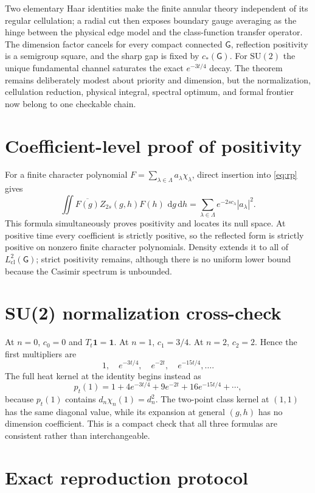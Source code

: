\documentclass[11pt]{article}
\theoremstyle{remark}
\newcommand{\SU}{\mathrm{SU}(2)}
\newcommand{\G}{\mathsf G}
\newcommand{\dd}{\,\mathrm d}
\newcommand{\HclG}{L^2_{\mathrm{cl}}(\G)}
\begin{document}
Two elementary Haar identities make the finite annular theory independent of
its regular cellulation; a radial cut then exposes boundary gauge averaging as
the hinge between the physical edge model and the class-function transfer
operator.  The dimension factor cancels for every compact connected $\G$,
reflection positivity is a semigroup square, and the sharp gap is fixed by
$c_*(\G)$.  For $\SU$ the unique fundamental channel saturates the exact
$e^{-3t/4}$ decay.  The theorem remains deliberately modest about priority and
dimension, but the normalization, cellulation reduction, physical integral,
spectral optimum, and formal frontier now belong to one checkable chain.

\appendix
\section{Coefficient-level proof of positivity}

For a finite character polynomial
$F=\sum_{\lambda\in\Lambda}a_\lambda\chi_\lambda$, direct insertion
into \eqref{eq:rp} gives
\[
 \iint\overline{F(g)}Z_{2s}(g,h)F(h)\,\dd g\dd h
 =\sum_{\lambda\in\Lambda}e^{-2sc_\lambda}|a_\lambda|^2.
\]
This formula simultaneously proves positivity and locates its null space.  At
positive time every coefficient is strictly positive, so the reflected form is
strictly positive on nonzero finite character polynomials.  Density extends it
to all of $\HclG$; strict positivity remains, although there is no uniform
lower bound because the Casimir spectrum is unbounded.

\section{SU(2) normalization cross-check}

At $n=0$, $c_0=0$ and $T_t\mathbf1=\mathbf1$.  At $n=1$,
$c_1=3/4$.  At $n=2$, $c_2=2$.  Hence the first multipliers are
\[
 1,\quad e^{-3t/4},\quad e^{-2t},\quad e^{-15t/4},\ldots.
\]
The full heat kernel at the identity begins instead as
\[
 p_t(1)=1+4e^{-3t/4}+9e^{-2t}+16e^{-15t/4}+\cdots,
\]
because $p_t(1)$ contains $d_n\chi_n(1)=d_n^2$.  The two-point class kernel at
$(1,1)$ has the same diagonal value, while its expansion at general $(g,h)$ has
no dimension coefficient.  This is a compact check that all three formulas are
consistent rather than interchangeable.

\section{Exact reproduction protocol}
\end{document}

